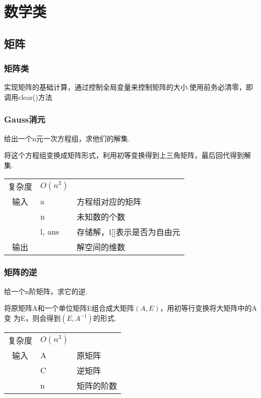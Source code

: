 \clearpage\chapter{数学类}

\section{矩阵}


    \subsection{矩阵类}\small
实现矩阵的基础计算，通过控制全局变量来控制矩阵的大小.使用前务必清零，即
调用clear()方法



    \subsection{Gauss消元}\small
给出一个n元一次方程组，求他们的解集.

将这个方程组变换成矩阵形式，利用初等变换得到上三角矩阵，最后回代得到解集.
\begin{longtable}{|c|l|l|}
复杂度 & $O(n^3)$ & \\
输入 & a & 方程组对应的矩阵 \\
 & n & 未知数的个数 \\
 & l, ans & 存储解，l[]表示是否为自由元 \\
输出 & & 解空间的维数 \\
\end{longtable}



    \subsection{矩阵的逆}\small
给一个n阶矩阵，求它的逆.

将原矩阵A和一个单位矩阵E组合成大矩阵$(A, E)$，用初等行变换将大矩阵中的A变
为E，则会得到$(E, A^{-1})$的形式.
\begin{longtable}{|c|l|l|}
复杂度 & $O(n^3)$ & \\
输入 & A & 原矩阵 \\
 & C & 逆矩阵 \\
 & n & 矩阵的阶数 \\
\end{longtable}



